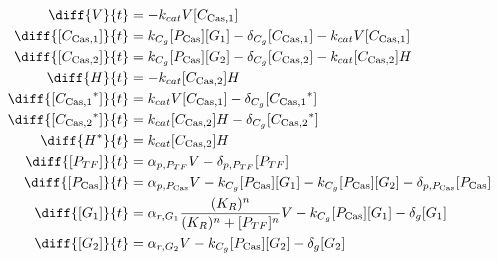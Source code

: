 \begin{align}
\diff{\vectorGen{}}{t} & = - \casCutRate{{}}\vectorGen{}\conc{\cplx{\cas}{1}}\\
\diff{\conc{\cplx{\cas}{1}}}{t} & =  \gRnaBind{}\conc{\proSp{\cas{}}}\conc{\gRna{1}} - \casCompDegradeRate{}\conc{\cplx{\cas}{1}} - \casCutRate{{}}\vectorGen{}\conc{\cplx{\cas}{1}}\\
\diff{\conc{\cplx{\cas}{2}}}{t} & =  \gRnaBind{}\conc{\proSp{\cas{}}}\conc{\gRna{2}} - \casCompDegradeRate{}\conc{\cplx{\cas}{2}} - \casCutRate{{}}\conc{\cplx{\cas}{2}}\hostGen{}\\
\diff{\hostGen{}}{t} & = - \casCutRate{{}}\conc{\cplx{\cas}{2}}\hostGen{}\\
\diff{\conc{\bound{\cplx{\cas}{1}}}}{t} & =  \casCutRate{{}}\vectorGen{}\conc{\cplx{\cas}{1}} - \casCompDegradeRate{}\conc{\bound{\cplx{\cas}{1}}}\\
\diff{\conc{\bound{\cplx{\cas}{2}}}}{t} & =  \casCutRate{{}}\conc{\cplx{\cas}{2}}\hostGen{} - \casCompDegradeRate{}\conc{\bound{\cplx{\cas}{2}}}\\
\diff{\edited{\hostGen{}}}{t} & =  \casCutRate{{}}\conc{\cplx{\cas}{2}}\hostGen{}\\
\diff{\conc{\proSp{TF}}}{t} & =  \txtlRate{\proSp{TF}}\vectorGen{} - \proDegradeRate{\proSp{TF}}\conc{\proSp{TF}}\\
\diff{\conc{\proSp{\cas{}}}}{t} & =  \txtlRate{\proSp{\cas{}}}\vectorGen{} - \gRnaBind{}\conc{\proSp{\cas{}}}\conc{\gRna{1}} - \gRnaBind{}\conc{\proSp{\cas{}}}\conc{\gRna{2}} - \proDegradeRate{\proSp{\cas{}}}\conc{\proSp{\cas{}}}\\
\diff{\conc{\gRna{1}}}{t} & =  \txRate{\gRna{1}}\frac{(K_R)^n}{(K_R)^n + \conc{\proSp{TF}}^n}\vectorGen{} - \gRnaBind{}\conc{\proSp{\cas{}}}\conc{\gRna{1}} - \rnaDegradeRate{}\conc{\gRna{1}}\\
\diff{\conc{\gRna{2}}}{t} & =  \txRate{\gRna{2}}\vectorGen{} - \gRnaBind{}\conc{\proSp{\cas{}}}\conc{\gRna{2}} - \rnaDegradeRate{}\conc{\gRna{2}}
\end{align}

